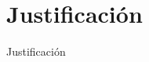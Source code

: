 \documentclass{standalone}
\begin{document}
\section*{Justificaci\'on}
Justificaci\'on
\end{document}
